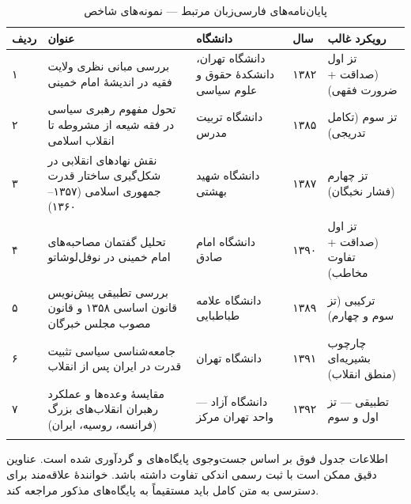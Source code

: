 \documentclass[12pt,a4paper]{book}
\newcommand{\en}[1]{\lr{\textit{#1}}}
\begin{document}
\begin{longtable}{%
    >{\raggedleft\arraybackslash}p{}
    >{\raggedleft\arraybackslash}p{}
    >{\raggedleft\arraybackslash}p{}
    >{\raggedleft\arraybackslash}p{}
    >{\raggedleft\arraybackslash}p{}}
\toprule
\rowcolor{cPrimary!10}
\textbf{ردیف} & \textbf{عنوان} & \textbf{دانشگاه} & \textbf{سال} & \textbf{رویکرد غالب} \\
\midrule
\endhead

۱ &
بررسی مبانی نظری ولایت فقیه در اندیشهٔ امام خمینی &
دانشگاه تهران، دانشکدهٔ حقوق و علوم سیاسی &
۱۳۸۲ &
تز اول (صداقت + ضرورت فقهی) \\
\midrule

۲ &
تحول مفهوم رهبری سیاسی در فقه شیعه از مشروطه تا انقلاب اسلامی &
دانشگاه تربیت مدرس &
۱۳۸۵ &
تز سوم (تکامل تدریجی) \\
\midrule

۳ &
نقش نهادهای انقلابی در شکل‌گیری ساختار قدرت جمهوری اسلامی (۱۳۵۷–۱۳۶۰) &
دانشگاه شهید بهشتی &
۱۳۸۷ &
تز چهارم (فشار نخبگان) \\
\midrule

۴ &
تحلیل گفتمان مصاحبه‌های امام خمینی در نوفل‌لوشاتو &
دانشگاه امام صادق &
۱۳۹۰ &
تز اول (صداقت + تفاوت مخاطب) \\
\midrule

۵ &
بررسی تطبیقی پیش‌نویس قانون اساسی ۱۳۵۸ و قانون مصوب مجلس خبرگان &
دانشگاه علامه طباطبایی &
۱۳۸۹ &
ترکیبی (تز سوم و چهارم) \\
\midrule

۶ &
جامعه‌شناسی سیاسی تثبیت قدرت در ایران پس از انقلاب &
دانشگاه تهران &
۱۳۹۱ &
چارچوب بشیریه‌ای (منطق انقلاب) \\
\midrule

۷ &
مقایسهٔ وعده‌ها و عملکرد رهبران انقلاب‌های بزرگ (فرانسه، روسیه، ایران) &
دانشگاه آزاد — واحد تهران مرکز &
۱۳۹۲ &
تطبیقی — تز اول و سوم \\

\bottomrule
\caption{پایان‌نامه‌های فارسی‌زبان مرتبط — نمونه‌های شاخص}
\label{tab:theses-persian}
\end{longtable}

\begin{warningBox}[تذکر]
اطلاعات جدول فوق بر اساس جست‌وجوی پایگاه‌های \en{IRANDOC} و \en{SID.ir} گردآوری شده است. عناوین دقیق ممکن است با ثبت رسمی اندکی تفاوت داشته باشد. خوانندهٔ علاقه‌مند برای دسترسی به متن کامل باید مستقیماً به پایگاه‌های مذکور مراجعه کند.
\end{warningBox}
\end{document}
